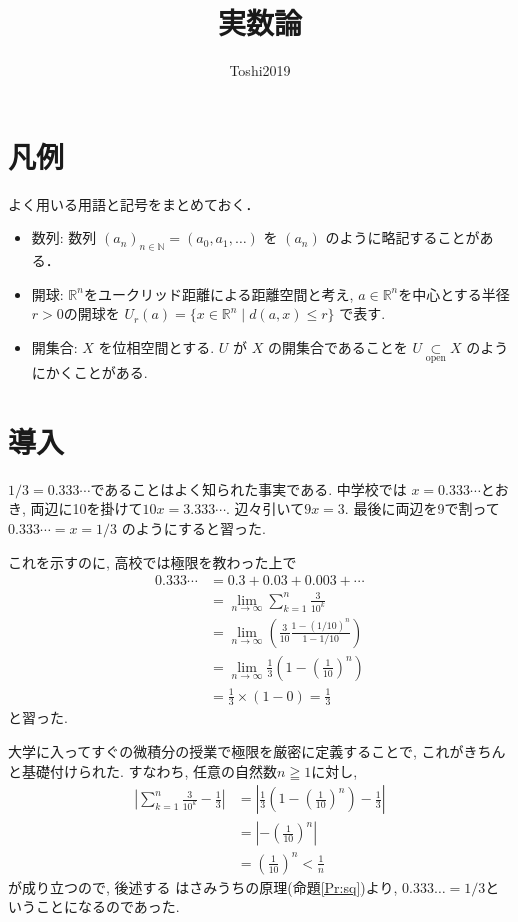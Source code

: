 \documentclass[11pt, a4paper, dvipdfmx]{jsarticle}
\title{実数論}
\author{Toshi2019}
\theoremstyle{definition}
\newcommand{\N}{\mathbb{N}}
\newcommand{\R}{\mathbb{R}}
\numberwithin{equation}{section} %
\begin{document}
\maketitle

\begin{abstract}
\end{abstract}
\section{凡例}

よく用いる用語と記号をまとめておく．
\begin{itemize}
  \item 数列: 
  数列 $(a_n)_{n\in\N} = (a_0,a_1,\dots)$ を 
  $(a_n)$ のように略記することがある．
  \item 開球: 
  ${\R}^n$をユークリッド距離による距離空間と考え, 
  $a\in{\R}^n$を中心とする半径$r > 0$の開球を
  $U_r(a) = \{x\in{\R}^n\mid d(a,x)\le r\}$
  で表す. 
  \item 開集合: 
  $X$ を位相空間とする. $U$ が $X$ の開集合であることを
  $U\underset{\text{open}}{\subset}X$ のようにかくことがある. 
\end{itemize}

\section{導入}

$1/3 = 0.333\cdots$であることはよく知られた事実である. 中学校では
$x = 0.333\cdots$とおき, 両辺に10を掛けて$10x = 3.333\cdots$. 
辺々引いて$9x = 3$. 最後に両辺を9で割って$0.333\cdots = x = 1/3$
のようにすると習った. 

これを示すのに, 高校では極限を教わった上で
\begin{align*}
  0.333\cdots 
  &= 0.3 + 0.03 + 0.003 + \cdots\\
  &= \lim_{n\to\infty}\sum_{k=1}^{n}\frac{3}{10^k}\\
  &= \lim_{n\to\infty}\left(\frac{3}{10}
  \frac{1-(1/10)^n}{1-1/10} \right)\\
  &= \lim_{n\to\infty}\frac{1}{3}
  \left(1-\left(\frac{1}{10}\right)^n\right)\\
  &= \frac{1}{3}\times(1-0) = \frac{1}{3}
\end{align*}
と習った. 

大学に入ってすぐの微積分の授業で極限を厳密に定義することで, 
これがきちんと基礎付けられた. すなわち, 任意の自然数$n\geqq1$に対し, 
\begin{align*}
  \left|\sum_{k=1}^{n}\frac{3}{10^k} - \frac{1}{3}\right| 
  &= \left|\frac{1}{3}
  \left(1-\left(\frac{1}{10}\right)^n\right)
  - \frac{1}{3}\right|\\
  &= \left|-\left(\frac{1}{10}\right)^n\right|\\
  &= \left(\frac{1}{10}\right)^n < \frac{1}{n}
\end{align*}
が成り立つので, 後述する
はさみうちの原理(命題\ref{Pr:sq})より, 
$0.333\dots=1/3$ということになるのであった. 
\end{document}
